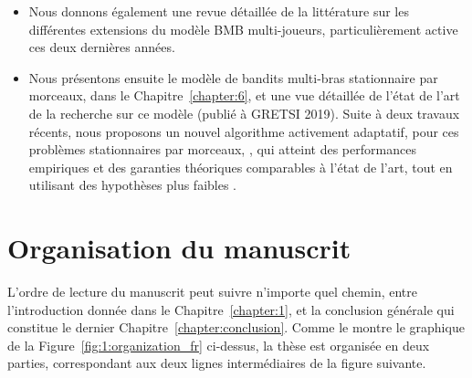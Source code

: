 \begin{resume_fr}
\begin{itemize}
    \item
    Nous donnons également une revue détaillée de la littérature sur les différentes extensions du modèle BMB multi-joueurs, particulièrement active ces deux dernières années.

    \item
    Nous présentons ensuite le modèle de bandits multi-bras stationnaire par morceaux, dans le Chapitre~\ref{chapter:6}, et une vue détaillée de l'état de l'art de la recherche sur ce modèle \cite{Besson2019GLRT,Besson2019Gretsi} (publié à GRETSI 2019).
    Suite à deux travaux récents, nous proposons un nouvel algorithme activement adaptatif, pour ces problèmes stationnaires par morceaux, \GLRklUCB, qui atteint des performances empiriques et des garanties théoriques comparables à l'état de l'art, tout en utilisant des hypothèses plus faibles .

\end{itemize}

\section*{Organisation du manuscrit}

%
L'ordre de lecture du manuscrit peut suivre n'importe quel chemin, entre l'introduction donnée dans le Chapitre~\ref{chapter:1}, et la conclusion générale qui constitue le dernier Chapitre~\ref{chapter:conclusion}.
Comme le montre le graphique de la Figure~\ref{fig:1:organization_fr} ci-dessus,
la thèse est organisée en deux parties, correspondant aux deux lignes intermédiaires de la figure suivante.


\end{resume_fr}
